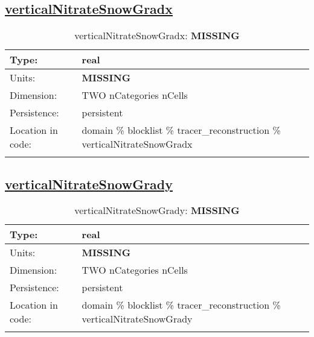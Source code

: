 \subsection[verticalNitrateSnowGradx]{\hyperref[sec:var_tab_tracer_reconstruction]{verticalNitrateSnowGradx}}
\label{subsec:var_sec_tracer_reconstruction_verticalNitrateSnowGradx}
\begin{center}
\begin{longtable}{| p{2.0in} | p{4.0in} |}
        \hline 
        Type: & real \\
        \hline 
        Units: & {\bf \color{red} MISSING} \\
        \hline 
        Dimension: & TWO nCategories nCells \\
        \hline 
        Persistence: & persistent \\
        \hline 
         Location in code: & domain \% blocklist \% tracer\_reconstruction \% verticalNitrateSnowGradx \\
         \hline 
    \caption{verticalNitrateSnowGradx: {\bf \color{red} MISSING}}
\end{longtable}
\end{center}
\subsection[verticalNitrateSnowGrady]{\hyperref[sec:var_tab_tracer_reconstruction]{verticalNitrateSnowGrady}}
\label{subsec:var_sec_tracer_reconstruction_verticalNitrateSnowGrady}
\begin{center}
\begin{longtable}{| p{2.0in} | p{4.0in} |}
        \hline 
        Type: & real \\
        \hline 
        Units: & {\bf \color{red} MISSING} \\
        \hline 
        Dimension: & TWO nCategories nCells \\
        \hline 
        Persistence: & persistent \\
        \hline 
         Location in code: & domain \% blocklist \% tracer\_reconstruction \% verticalNitrateSnowGrady \\
         \hline 
    \caption{verticalNitrateSnowGrady: {\bf \color{red} MISSING}}
\end{longtable}
\end{center}
